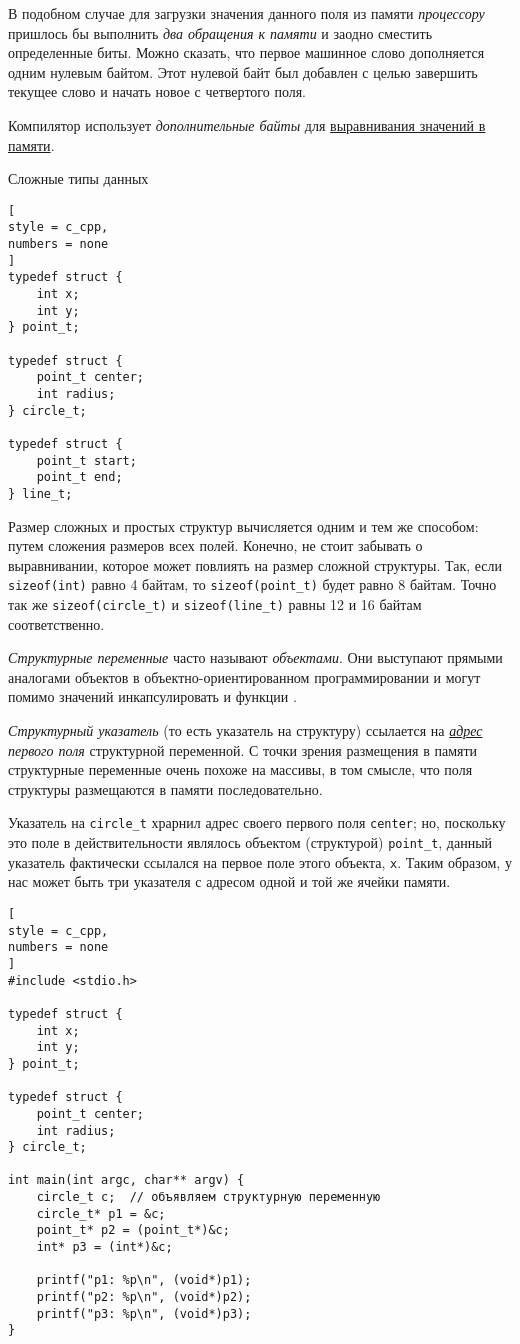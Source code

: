 \documentclass[%
	11pt,
	a4paper,
	utf8,
		]{article}
\begin{document}
В подобном случае для загрузки значения данного поля из памяти \emph{процессору} пришлось бы выполнить \emph{два обращения к памяти} и заодно сместить определенные биты. Можно сказать, что первое машинное слово дополняется одним нулевым байтом. Этот нулевой байт был добавлен с целью завершить текущее слово и начать новое с четвертого поля.

Компилятор использует \emph{дополнительные байты} для \underline{выравнивания значений в памяти}.

Сложные типы данных
\begin{lstlisting}[
style = c_cpp,
numbers = none
]
typedef struct {
    int x;
    int y;
} point_t;

typedef struct {
    point_t center;
    int radius;
} circle_t;

typedef struct {
    point_t start;
    point_t end;
} line_t;
\end{lstlisting}

Размер сложных и простых структур вычисляется одним и тем же способом: путем сложения размеров всех полей. Конечно, не стоит забывать о выравнивании, которое может повлиять на размер сложной структуры. Так, если \verb|sizeof(int)| равно 4 байтам, то \verb|sizeof(point_t)| будет равно 8 байтам. Точно так же \verb|sizeof(circle_t)| и \verb|sizeof(line_t)| равны 12 и 16 байтам соответственно.

\emph{Структурные переменные} часто называют \emph{объектами}. Они выступают прямыми аналогами объектов в объектно-ориентированном программировании и могут помимо значений инкапсулировать и функции \cite[]{amini-extreme-c:2022}.

\emph{Структурный указатель} (то есть указатель на структуру) ссылается на \underline{\itshape адрес} \emph{первого поля} структурной переменной. С точки зрения размещения в памяти структурные переменные очень похоже на массивы, в том смысле, что поля структуры размещаются в памяти последовательно.

Указатель на \verb|circle_t| храрнил адрес своего первого поля \verb|center|; но, поскольку это поле в действительности являлось объектом (структурой) \verb|point_t|, данный указатель фактически ссылался на первое поле этого объекта, \verb|x|. Таким образом, у нас может быть три указателя с адресом одной и той же ячейки памяти.
\begin{lstlisting}[
style = c_cpp,
numbers = none
]
#include <stdio.h>

typedef struct {
    int x;
    int y;
} point_t;

typedef struct {
    point_t center;
    int radius;
} circle_t;

int main(int argc, char** argv) {
    circle_t c;  // объявляем структурную переменную
    circle_t* p1 = &c;
    point_t* p2 = (point_t*)&c;
    int* p3 = (int*)&c;
    
    printf("p1: %p\n", (void*)p1);
    printf("p2: %p\n", (void*)p2);
    printf("p3: %p\n", (void*)p3);
}
\end{lstlisting}
\end{document}
